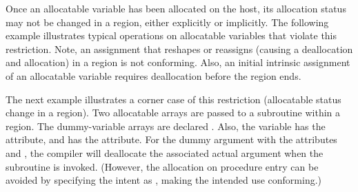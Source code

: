 \begin{fortranspecific}[4ex]

Once an allocatable variable has been allocated on the host,
its allocation status may not be changed in a  region, either
explicitly or implicitly. The following example illustrates typical
operations on allocatable variables that violate this restriction.
Note, an assignment that reshapes or reassigns (causing a deallocation
and allocation) in a  region is not conforming.
Also, an initial intrinsic assignment of an allocatable variable 
requires deallocation before the  region ends.


\newpage
The next example illustrates a corner case of this restriction (allocatable status
change in a  region).
Two allocatable arrays are passed to a subroutine within a 
region. The dummy-variable arrays are declared .
Also, the  variable has the  attribute, and 
has the  attribute. 
For the dummy argument with the attributes  and , 
the compiler will deallocate the associated actual argument when the subroutine is invoked. 
(However, the allocation on procedure entry can be avoided by specifying the intent 
as , making the intended use conforming.)

\end{fortranspecific}
